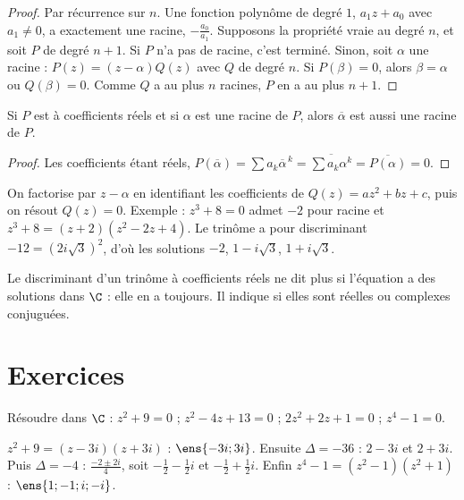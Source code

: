 \begin{proof}
Par récurrence sur $n$. Une fonction polynôme de degré $1$, $a_1z+a_0$ avec $a_1\neq0$, a exactement une racine, $-\frac{a_0}{a_1}$. Supposons la propriété vraie au degré $n$, et soit $P$ de degré $n+1$. Si $P$ n'a pas de racine, c'est terminé. Sinon, soit $\alpha$ une racine : $P(z)=(z-\alpha)Q(z)$ avec $Q$ de degré $n$. Si $P(\beta)=0$, alors $\beta=\alpha$ ou $Q(\beta)=0$. Comme $Q$ a au plus $n$ racines, $P$ en a au plus $n+1$.
\end{proof}
\begin{theorem}
Si $P$ est à coefficients réels et si $\alpha$ est une racine de $P$, alors $\overline\alpha$ est aussi une racine de $P$.
\end{theorem}
\begin{proof}
Les coefficients étant réels, $P\left(\overline\alpha\right)=\sum a_k\overline\alpha^{\,k}=\overline{\sum a_k\alpha^k}=\overline{P(\alpha)}=0$.
\end{proof}
\begin{method}
On factorise par $z-\alpha$ en identifiant les coefficients de $Q(z)=az^2+bz+c$, puis on résout $Q(z)=0$. Exemple : $z^3+8=0$ admet $-2$ pour racine et $z^3+8=(z+2)\left(z^2-2z+4\right)$. Le trinôme a pour discriminant $-12=\left(2i\sqrt3\right)^2$, d'où les solutions $-2$, $1-i\sqrt3$, $1+i\sqrt3$.
\end{method}
\begin{pitfall}
Le discriminant d'un trinôme à coefficients réels ne dit plus si l'équation a des solutions dans $\C$ : elle en a toujours. Il indique si elles sont réelles ou complexes conjuguées.
\end{pitfall}

\mxnewpage
\section{Exercices}
\begin{exercise}
Résoudre dans $\C$ : $z^2+9=0$ ; $z^2-4z+13=0$ ; $2z^2+2z+1=0$ ; $z^4-1=0$.
\end{exercise}
\begin{solution}
$z^2+9=(z-3i)(z+3i)$ : $\ens{-3i;3i}$. Ensuite $\Delta=-36$ : $2-3i$ et $2+3i$. Puis $\Delta=-4$ : $\frac{-2\pm2i}{4}$, soit $-\frac12-\frac12i$ et $-\frac12+\frac12i$. Enfin $z^4-1=\left(z^2-1\right)\left(z^2+1\right)$ : $\ens{1;-1;i;-i}$.
\end{solution}

